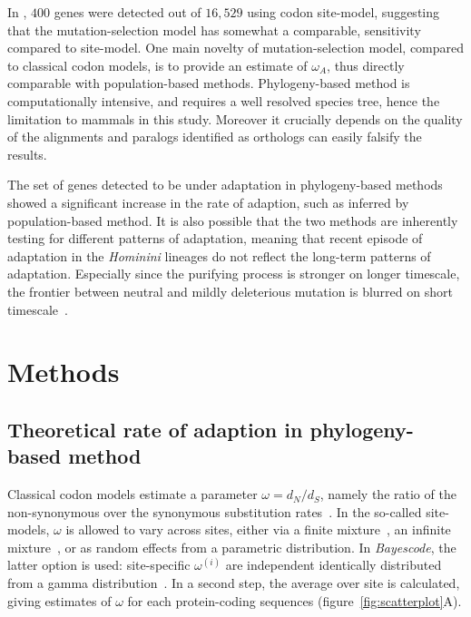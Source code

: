 \documentclass{article}
\newcommand{\dn}{d_N}
\newcommand{\ds}{d_S}
\newcommand{\dnds}{\dn / \ds}
\begin{document}
In \citet{kosiol_patterns_2008}, $400$ genes were detected out of $16,529$ using codon site-model, suggesting that the mutation-selection model has somewhat a comparable, sensitivity compared to site-model.
One main novelty of mutation-selection model, compared to classical codon models, is to provide an estimate of $\omega_A$, thus directly comparable with population-based methods.
Phylogeny-based method is computationally intensive, and requires a well resolved species tree, hence the limitation to mammals in this study.
Moreover it crucially depends on the quality of the alignments and paralogs identified as orthologs can easily falsify the results.

The set of genes detected to be under adaptation in phylogeny-based methods showed a significant increase in the rate of adaption, such as inferred by population-based method.
It is also possible that the two methods are inherently testing for different patterns of adaptation, meaning that recent episode of adaptation in the \textit{Hominini} lineages do not reflect the long-term patterns of adaptation.
Especially since the purifying process is stronger on longer timescale, the frontier between neutral and mildly deleterious mutation is blurred on short timescale~\citep{ho_time_2005}.

\section*{Methods}

\subsection*{Theoretical rate of adaption in phylogeny-based method}
Classical codon models estimate a parameter $\omega=\dnds$, namely the ratio of the non-synonymous over the synonymous substitution rates~\citep{muse_likelihood_1994,goldman_codon-based_1994}.
In the so-called site-models, $\omega$ is allowed to vary across sites, either via a finite mixture~\citep{yang_codon-substitution_2000}, an infinite mixture~\citep{huelsenbeck_dirichlet_2006}, or as random effects from a parametric distribution.
In \textit{Bayescode}, the latter option is used: site-specific $\omega^{(i)}$ are independent identically distributed from a gamma distribution~\citep{lartillot_phylobayes_2013}.
In a second step, the average over site is calculated, giving estimates of $\omega$ for each protein-coding sequences (figure~\ref{fig:scatterplot}A).
\end{document}
